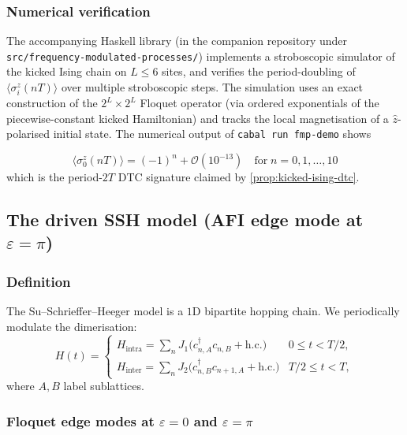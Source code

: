 \documentclass[12pt]{article}
\theoremstyle{definition}
\theoremstyle{remark}
\begin{document}
\subsubsection{Numerical verification}

{\sloppy
The accompanying Haskell library (in the companion repository under \texttt{src/frequency-mo\-du\-la\-ted-processes/}) implements a stroboscopic simulator of the kicked Ising chain on $L\leq 6$ sites, and verifies the period-doubling of $\langle\sigma^z_i(nT)\rangle$ over multiple stroboscopic steps. The simulation uses an exact construction of the $2^L\times 2^L$ Floquet operator (via ordered exponentials of the piecewise-constant kicked Hamiltonian) and tracks the local magnetisation of a $\hat{z}$-polarised initial state. The numerical output of \texttt{cabal run fmp-demo} shows
\par}
\begin{equation*}
\langle\sigma^z_0(nT)\rangle = (-1)^n + \mathcal{O}(10^{-13})\quad\text{for}\;n=0,1,\ldots,10
\end{equation*}
which is the period-$2T$ DTC signature claimed by \cref{prop:kicked-ising-dtc}.

\subsection{The driven SSH model (AFI edge mode at \texorpdfstring{$\varepsilon=\pi$}{epsilon=pi})}

\subsubsection{Definition}

The Su--Schrieffer--Heeger model is a $1$D bipartite hopping chain. We periodically modulate the dimerisation:
\begin{equation}
H(t) = \begin{cases}
H_{\mathrm{intra}} = \sum_n J_1\bigl(c_{n,A}^\dagger c_{n,B}+\mathrm{h.c.}\bigr) & 0\leq t<T/2,\\
H_{\mathrm{inter}} = \sum_n J_2\bigl(c_{n,B}^\dagger c_{n+1,A}+\mathrm{h.c.}\bigr) & T/2\leq t<T,
\end{cases}
\end{equation}
where $A,B$ label sublattices.

\subsubsection{Floquet edge modes at \texorpdfstring{$\varepsilon=0$}{epsilon=0} and \texorpdfstring{$\varepsilon=\pi$}{epsilon=pi}}
\end{document}
